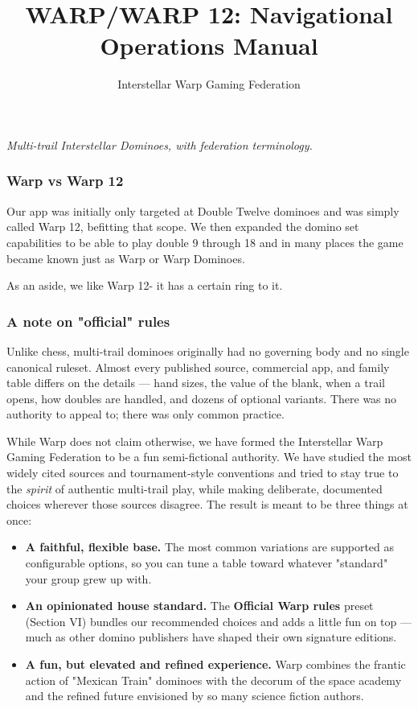 \documentclass[11pt]{article}
\title{WARP/WARP 12: Navigational Operations Manual}
\author{Interstellar Warp Gaming Federation}
\date{}
\providecommand{\tightlist}{%
  \setlength{\itemsep}{0pt}\setlength{\parskip}{0pt}}
\begin{document}
\maketitle

\emph{Multi-trail Interstellar Dominoes, with federation terminology.}

\subsubsection{Warp vs Warp 12}\label{warp-vs-warp-12}

Our app was initially only targeted at Double Twelve dominoes and was
simply called Warp 12, befitting that scope. We then expanded the domino
set capabilities to be able to play double 9 through 18 and in many
places the game became known just as Warp or Warp Dominoes.

As an aside, we like Warp 12- it has a certain ring to it.

\subsubsection{A note on "official"
rules}\label{a-note-on-official-rules}

Unlike chess, multi-trail dominoes originally had no governing body and
no single canonical ruleset. Almost every published source, commercial
app, and family table differs on the details --- hand sizes, the value
of the blank, when a trail opens, how doubles are handled, and dozens of
optional variants. There was no authority to appeal to; there was only
common practice.

While Warp does not claim otherwise, we have formed the Interstellar
Warp Gaming Federation to be a fun semi-fictional authority. We have
studied the most widely cited sources and tournament-style conventions
and tried to stay true to the \emph{spirit} of authentic multi-trail
play, while making deliberate, documented choices wherever those sources
disagree. The result is meant to be three things at once:

\begin{itemize}
\tightlist
\item
  \textbf{A faithful, flexible base.} The most common variations are
  supported as configurable options, so you can tune a table toward
  whatever "standard" your group grew up with.
\item
  \textbf{An opinionated house standard.} The \textbf{Official Warp
  rules} preset (Section VI) bundles our recommended choices and adds a
  little fun on top --- much as other domino publishers have shaped
  their own signature editions.
\item
  \textbf{A fun, but elevated and refined experience.} Warp combines the
  frantic action of "Mexican Train" dominoes with the decorum of the
  space academy and the refined future envisioned by so many science
  fiction authors.
\end{itemize}
\end{document}
